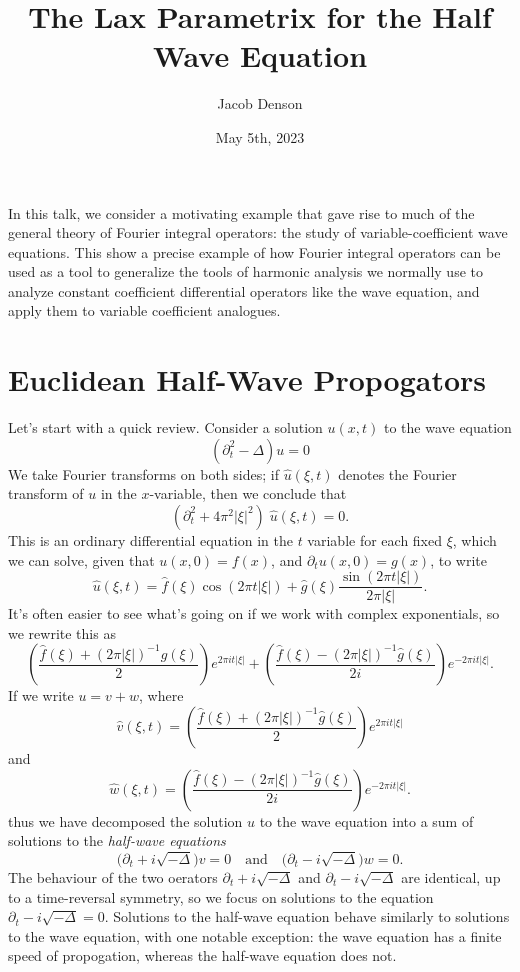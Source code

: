 \documentclass{article}
\title{The Lax Parametrix for the Half Wave Equation}
\author{Jacob Denson}
\date{May 5th, 2023}
\theoremstyle{plain}
\theoremstyle{remark}
\theoremstyle{definition}
\begin{document}
\maketitle

In this talk, we consider a motivating example that gave rise to much of the general theory of Fourier integral operators: the study of variable-coefficient wave equations. This show a precise example of how Fourier integral operators can be used as a tool to generalize the tools of harmonic analysis we normally use to analyze constant coefficient differential operators like the wave equation, and apply them to variable coefficient analogues.

\section{Euclidean Half-Wave Propogators}

Let's start with a quick review. Consider a solution $u(x,t)$ to the wave equation
%
\[ (\partial_t^2 - \Delta) u = 0 \]
%
We take Fourier transforms on both sides; if $\widehat{u}(\xi,t)$ denotes the Fourier transform of $u$ in the $x$-variable, then we conclude that
%
\[ (\partial_t^2 + 4 \pi^2 |\xi|^2)\; \widehat{u}(\xi,t) = 0. \]
%
This is an ordinary differential equation in the $t$ variable for each fixed $\xi$, which we can solve, given that $u(x,0) = f(x)$, and $\partial_t u(x,0) = g(x)$, to write
%
\[ \widehat{u}(\xi,t) = \widehat{f}(\xi) \cos(2 \pi t |\xi|) + \widehat{g}(\xi) \frac{\sin(2 \pi t |\xi|)}{2 \pi |\xi|}. \]
%
It's often easier to see what's going on if we work with complex exponentials, so we rewrite this as
%
\[ \left( \frac{\widehat{f}(\xi) + (2 \pi |\xi|)^{-1} \widehat{g}(\xi)}{2} \right) e^{2 \pi i t |\xi|} + \left( \frac{\widehat{f}(\xi) - (2 \pi |\xi|)^{-1} \widehat{g}(\xi)}{2i} \right) e^{-2 \pi i t |\xi|}. \]
%
If we write $u = v + w$, where
%
\[ \widehat{v}(\xi,t) = \left( \frac{\widehat{f}(\xi) + (2 \pi |\xi|)^{-1} \widehat{g}(\xi)}{2} \right) e^{2 \pi i t |\xi|} \]
%
and 
%
\[ \widehat{w}(\xi,t) = \left( \frac{\widehat{f}(\xi) - (2 \pi |\xi|)^{-1} \widehat{g}(\xi)}{2i} \right) e^{-2 \pi i t |\xi|}. \]
%
thus we have decomposed the solution $u$ to the wave equation into a sum of solutions to the \emph{half-wave equations}
%
\[ \Big( \partial_t + i \sqrt{-\Delta} \Big) v = 0 \quad\text{and}\quad \Big(\partial_t - i \sqrt{-\Delta} \Big) w = 0. \]
%
The behaviour of the two oerators $\partial_t + i \sqrt{-\Delta}$ and $\partial_t - i \sqrt{-\Delta}$ are identical, up to a time-reversal symmetry, so we focus on solutions to the equation $\partial_t - i \sqrt{-\Delta} = 0$. Solutions to the half-wave equation behave similarly to solutions to the wave equation, with one notable exception: the wave equation has a finite speed of propogation, whereas the half-wave equation does not.
\end{document}
